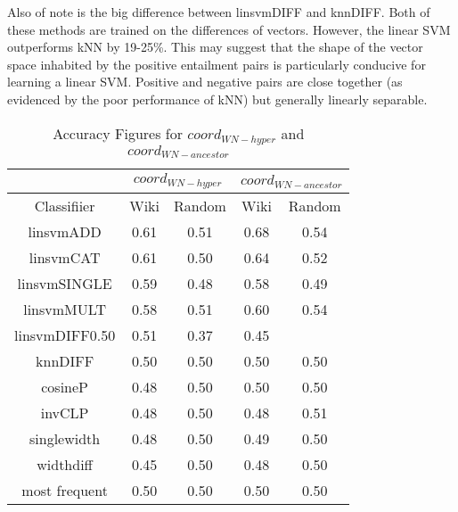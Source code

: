 \documentclass[11pt]{article}
\begin{document}
Also of note is the big difference between linsvmDIFF and knnDIFF.  Both of these methods are trained on the differences of vectors.  However, the linear SVM outperforms kNN by 19-25\%.  This may suggest that the shape of the vector space inhabited by the positive entailment pairs is particularly conducive for learning a linear SVM.  Positive and negative pairs are close together (as evidenced by the poor performance of kNN) but generally linearly separable.

\begin{table*}[ht]
\centering
\begin{tabular}{|c|c|c|c|c|}
\hline
&\multicolumn{2}{|c|}{$coord_{WN-hyper}$}&\multicolumn{2}{|c|}{$coord_{WN-ancestor}$}\\
\hline
Classifiier&Wiki&Random&Wiki&Random\\
\hline
linsvmADD&0.61&0.51&0.68&0.54\\
linsvmCAT&0.61&0.50&0.64&0.52\\
linsvmSINGLE&0.59&0.48&0.58&0.49\\
linsvmMULT&0.58&0.51&0.60&0.54\\
linsvmDIFF0.50&0.51&0.37&0.45\\
knnDIFF&0.50&0.50&0.50&0.50\\
cosineP&0.48&0.50&0.50&0.50\\
invCLP&0.48&0.50&0.48&0.51\\
singlewidth&0.48&0.50&0.49&0.50\\
widthdiff&0.45&0.50&0.48&0.50\\
most frequent&0.50&0.50&0.50&0.50\\
\hline
\end{tabular}
\caption{Accuracy Figures for $coord_{WN-hyper}$ and $coord_{WN-ancestor}$}
\label{table:results_coord_WN}
\end{table*}
\end{document}
